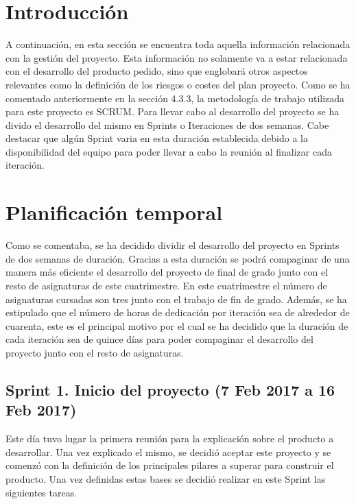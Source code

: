 
\section{Introducción}

A continuación, en esta sección se encuentra toda aquella información relacionada con la gestión del proyecto. Esta información no solamente va a estar relacionada con el desarrollo del producto pedido, sino que englobará otros aspectos relevantes como la definición de los riesgos o costes del plan proyecto.
Como se ha comentado anteriormente en la sección 4.3.3, la metodología de trabajo utilizada para este proyecto es SCRUM. Para llevar cabo al desarrollo del proyecto se ha divido el desarrollo del mismo en Sprints o Iteraciones de dos semanas. Cabe destacar que algún Sprint varia en esta duración establecida debido a la disponibilidad del equipo para poder llevar a cabo la reunión al finalizar cada iteración.


\section{Planificación temporal}

Como se comentaba, se ha decidido dividir el desarrollo del proyecto en Sprints de dos semanas de duración. Gracias a esta duración se podrá compaginar de una manera más eficiente el desarrollo del proyecto de final de grado junto con el resto de asignaturas de este cuatrimestre. En este cuatrimestre el número de asignaturas cursadas son tres junto con el trabajo de fin de grado. Además, se ha estipulado que el número de horas de dedicación por iteración sea de alrededor de cuarenta, este es el principal motivo por el cual se ha decidido que la duración de cada iteración sea de quince días para poder compaginar el desarrollo del proyecto junto con el resto de asignaturas.

\subsection{Sprint 1. Inicio del proyecto (7 Feb 2017 a 16 Feb 2017)}

Este día tuvo lugar la primera reunión para la explicación sobre el producto a desarrollar. Una vez explicado el mismo, se decidió aceptar este proyecto y se comenzó con la definición de los principales pilares a superar para construir el producto. Una vez definidas estas bases se decidió realizar en este Sprint las siguientes tareas.

